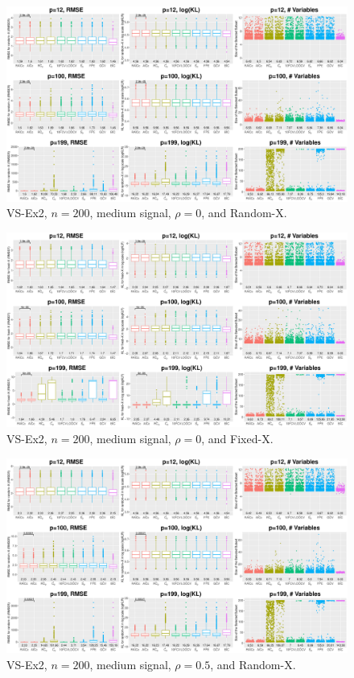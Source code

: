 \clearpage
\begin{figure}[!ht]
\centering
\includegraphics[width=\textwidth]{figures/supplement/randomx_VS-Ex2_n200_msnr_rho0.eps}
\caption{VS-Ex2, $n=200$, medium signal, $\rho=0$, and Random-X.}
\end{figure}
\begin{figure}[!ht]
\centering
\includegraphics[width=\textwidth]{figures/supplement/fixedx_VS-Ex2_n200_msnr_rho0.eps}
\caption{VS-Ex2, $n=200$, medium signal, $\rho=0$, and Fixed-X.}
\end{figure}
\clearpage
\begin{figure}[!ht]
\centering
\includegraphics[width=\textwidth]{figures/supplement/randomx_VS-Ex2_n200_msnr_rho05.eps}
\caption{VS-Ex2, $n=200$, medium signal, $\rho=0.5$, and Random-X.}
\end{figure}
